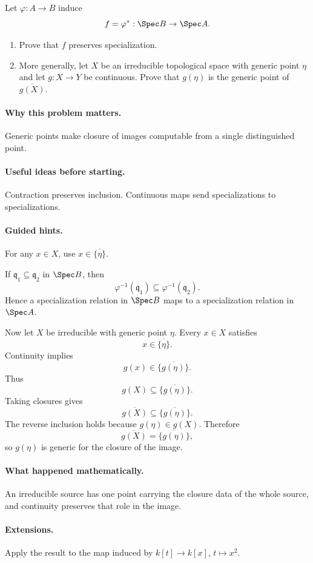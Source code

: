 \begin{problem}
Let $\varphi:A\to B$ induce
\[
f=\varphi^\ast:\Spec B\to\Spec A.
\]
\begin{enumerate}
\item Prove that $f$ preserves specialization.
\item More generally, let $X$ be an irreducible topological space with generic point
$\eta$ and let $g:X\to Y$ be continuous.  Prove that $g(\eta)$ is the generic point of
$\overline{g(X)}$.
\end{enumerate}
\end{problem}

\paragraph{Why this problem matters.}
Generic points make closure of images computable from a single distinguished point.

\paragraph{Useful ideas before starting.}
Contraction preserves inclusion.  Continuous maps send specializations to
specializations.

\paragraph{Guided hints.}
For any $x\in X$, use $x\in\overline{\{\eta\}}$.

\begin{solution}
If $\mathfrak q_1\subseteq\mathfrak q_2$ in $\Spec B$, then
\[
\varphi^{-1}(\mathfrak q_1)\subseteq\varphi^{-1}(\mathfrak q_2).
\]
Hence a specialization relation in $\Spec B$ maps to a specialization relation in
$\Spec A$.

Now let $X$ be irreducible with generic point $\eta$.  Every $x\in X$ satisfies
\[
x\in\overline{\{\eta\}}.
\]
Continuity implies
\[
g(x)\in\overline{\{g(\eta)\}}.
\]
Thus
\[
g(X)\subseteq\overline{\{g(\eta)\}}.
\]
Taking closures gives
\[
\overline{g(X)}
\subseteq
\overline{\{g(\eta)\}}.
\]
The reverse inclusion holds because $g(\eta)\in g(X)$.  Therefore
\[
\overline{g(X)}
=
\overline{\{g(\eta)\}},
\]
so $g(\eta)$ is generic for the closure of the image.
\end{solution}

\paragraph{What happened mathematically.}
An irreducible source has one point carrying the closure data of the whole source, and
continuity preserves that role in the image.

\paragraph{Extensions.}
Apply the result to the map induced by $k[t]\to k[x]$, $t\mapsto x^2$.

